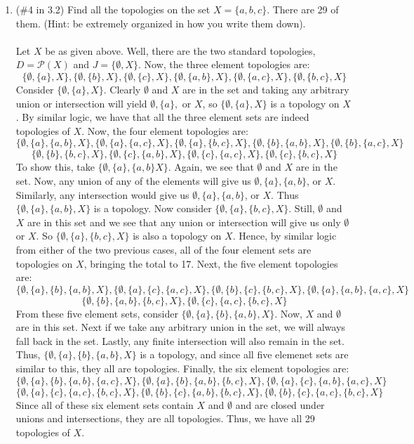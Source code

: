 \documentclass[12pt]{article}
\begin{document}
\begin{enumerate}
\item (\#4 in 3.2) Find all the topologies on the set $X = \{a,b,c\}$. There are 29 of them. (Hint: be extremely organized in how you write them down).\\\\
Let $X$ be as given above. Well, there are the two standard topologies, $D=\mathcal{P}(X)$ and $J=\{\emptyset, X\}$. Now, the three element topologies are: $$\{\emptyset, \{a\}, X\}, \{\emptyset, \{b\}, X\}, \{\emptyset, \{c\}, X\}, \{\emptyset, \{a,b\}, X\}, \{\emptyset, \{a,c\}, X\}, \{\emptyset, \{b,c\}, X\}$$Consider $\{\emptyset, \{a\}, X\}$. Clearly $\emptyset$ and $X$ are in the set and taking any arbitrary union or intersection will yield $\emptyset, \{a\},$ or $X$, so $\{\emptyset, \{a\}, X\}$ is a topology on $X$. By similar logic, we have that all the three element sets are indeed topologies of $X$. Now, the four element topologies are: $$\{\emptyset, \{a\}, \{a,b\}, X\}, \{\emptyset, \{a\}, \{a,c\}, X\}, \{\emptyset, \{a\}, \{b,c\}, X\}, \{\emptyset, \{b\}, \{a,b\}, X\}, \{\emptyset, \{b\}, \{a,c\}, X\}$$ $$\{\emptyset, \{b\}, \{b,c\}, X\}, \{\emptyset, \{c\}, \{a,b\}, X\}, \{\emptyset, \{c\}, \{a,c\}, X\}, \{\emptyset, \{c\}, \{b,c\}, X\}$$To show this, take $\{\emptyset, \{a\}, \{a,b\} X\}$. Again, we see that $\emptyset$ and $X$ are in the set. Now, any union of any of the elements will give us $\emptyset, \{a\}, \{a,b\}$, or $X$. Similarly, any intersection would give us $\emptyset, \{a\}, \{a,b\}$, or $X$. Thus $\{\emptyset, \{a\}, \{a,b\}, X\}$ is a topology. Now consider $\{\emptyset, \{a\}, \{b,c\}, X\}$. Still, $\emptyset$ and $X$ are in this set and we see that any union or intersection will give us only $\emptyset$ or $X$. So $\{\emptyset, \{a\}, \{b,c\}, X\}$ is also a topology on $X$. Hence, by similar logic from either of the two previous cases, all of the four element sets are topologies on $X$, bringing the total to 17. Next, the five element topologies are: $$\{\emptyset, \{a\}, \{b\}, \{a,b\}, X\}, \{\emptyset, \{a\}, \{c\}, \{a,c\}, X\}, \{\emptyset, \{b\}, \{c\}, \{b,c\}, X\}, \{\emptyset, \{a\}, \{a,b\}, \{a,c\}, X\}$$ $$\{\emptyset, \{b\}, \{a,b\}, \{b,c\}, X\}, \{\emptyset, \{c\}, \{a,c\}, \{b,c\}, X\}$$From these five element sets, consider $\{\emptyset, \{a\}, \{b\}, \{a,b\}, X\}$. Now, $X$ and $\emptyset$ are in this set. Next if we take any arbitrary union in the set, we will always fall back in the set. Lastly, any finite intersection will also remain in the set. Thus, $\{\emptyset, \{a\}, \{b\}, \{a,b\}, X\}$ is a topology, and since all five elemenet sets are similar to this, they all are topologies. Finally, the six element topologies are: $$\{\emptyset, \{a\}, \{b\}, \{a,b\}, \{a,c\}, X\}, \{\emptyset, \{a\}, \{b\}, \{a,b\}, \{b,c\}, X\}, \{\emptyset, \{a\}, \{c\}, \{a,b\}, \{a,c\}, X\}$$ $$\{\emptyset, \{a\}, \{c\}, \{a,c\}, \{b,c\}, X\}, \{\emptyset, \{b\}, \{c\}, \{a,b\}, \{b,c\}, X\}, \{\emptyset, \{b\}, \{c\}, \{a,c\}, \{b,c\}, X\}$$Since all of these six element sets contain $X$ and $\emptyset$ and are closed under unions and intersections, they are all topologies. Thus, we have all 29 topologies of $X$.\\[20pt]


\end{enumerate}
\end{document}
